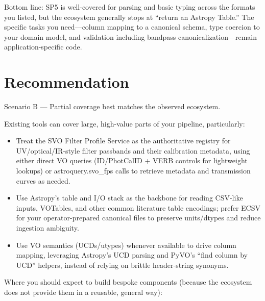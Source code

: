 \documentclass[twocolumn]{aastex701}
\begin{document}
Bottom line: SP5 is well-covered for parsing and basic typing across the formats you listed, but the ecosystem generally stops at “return an Astropy Table.” The specific tasks you need—column mapping to a canonical schema, type coercion to your domain model, and validation including bandpass canonicalization—remain application-specific code.


\section{Recommendation}

Scenario B — Partial coverage best matches the observed ecosystem.

Existing tools can cover large, high-value parts of your pipeline, particularly:

\begin{itemize}
\item Treat the SVO Filter Profile Service as the authoritative registry for UV/optical/IR-style filter passbands and their calibration metadata, using either direct VO queries (ID/PhotCalID + VERB controls for lightweight lookups) or astroquery.svo\_fps calls to retrieve metadata and transmission curves as needed. \citep{ref37}

\item Use Astropy’s table and I/O stack as the backbone for reading CSV-like inputs, VOTables, and other common literature table encodings; prefer ECSV for your operator-prepared canonical files to preserve units/dtypes and reduce ingestion ambiguity. \citep{ref38}

\item Use VO semantics (UCDs/utypes) whenever available to drive column mapping, leveraging Astropy’s UCD parsing and PyVO’s “find column by UCD” helpers, instead of relying on brittle header-string synonyms. \citep{ref39}
\end{itemize}

Where you should expect to build bespoke components (because the ecosystem does not provide them in a reusable, general way):
\end{document}
